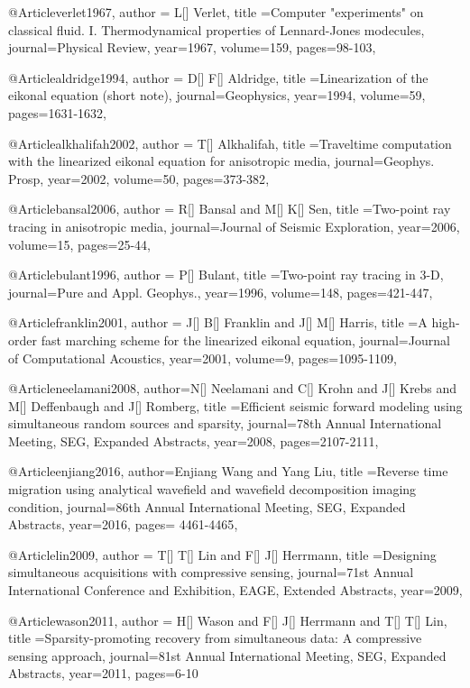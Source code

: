 @Article{verlet1967,
  author = {L[] Verlet},
  title ={Computer "experiments" on classical fluid. I. Thermodynamical properties of Lennard-Jones modecules},
  journal={Physical Review},
  year=1967,
  volume=159,
  pages={98-103},
}


@Article{aldridge1994,
  author = {D[] F[] Aldridge},
  title ={Linearization of the eikonal equation (short note)},
  journal={Geophysics},
  year=1994,
  volume=59,
  pages={1631-1632},
}

@Article{alkhalifah2002,
  author = {T[] Alkhalifah},
  title ={Traveltime computation with the linearized eikonal equation for anisotropic media},
  journal={Geophys. Prosp},
  year=2002,
  volume=50,
  pages={373-382},
}

@Article{bansal2006,
  author = {R[] Bansal and M[] K[] Sen},
  title ={Two-point ray tracing in anisotropic media},
  journal={Journal of Seismic Exploration},
  year=2006,
  volume=15,
  pages={25-44},
}

@Article{bulant1996,
  author = {P[] Bulant},
  title ={Two-point ray tracing in 3-D},
  journal={Pure and Appl. Geophys.},
  year=1996,
  volume=148,
  pages={421-447},
}


@Article{franklin2001,
  author = {J[] B[] Franklin and J[] M[] Harris},
  title ={A high-order fast marching scheme for the linearized eikonal equation},
  journal={Journal of Computational Acoustics},
  year=2001,
  volume=9,
  pages={1095-1109},
}

@Article{neelamani2008,
  author={N[] Neelamani and C[] Krohn and J[] Krebs and M[] Deffenbaugh and J[] Romberg},
  title ={Efficient seismic forward modeling using simultaneous random sources and sparsity},
  journal={78th Annual International Meeting, SEG, Expanded Abstracts},
  year=2008,
  pages={2107-2111},
}

@Article{enjiang2016,
  author={Enjiang Wang and Yang Liu},
  title ={Reverse time migration using analytical wavefield and wavefield decomposition imaging
condition},
  journal={86th Annual International Meeting, SEG, Expanded Abstracts},
  year=2016,
  pages={ 4461-4465},
}

@Article{lin2009,
  author = {T[] T[] Lin and F[] J[] Herrmann},
  title ={Designing simultaneous acquisitions with compressive sensing},
  journal={71st Annual International Conference and Exhibition, EAGE, Extended Abstracts},
  year=2009,
}

@Article{wason2011,
  author = {H[] Wason and F[] J[] Herrmann and T[] T[] Lin},
  title ={Sparsity-promoting recovery from simultaneous data: A compressive sensing approach},
  journal={81st Annual International Meeting, SEG, Expanded Abstracts},
  year=2011,
  pages={6-10}
}

